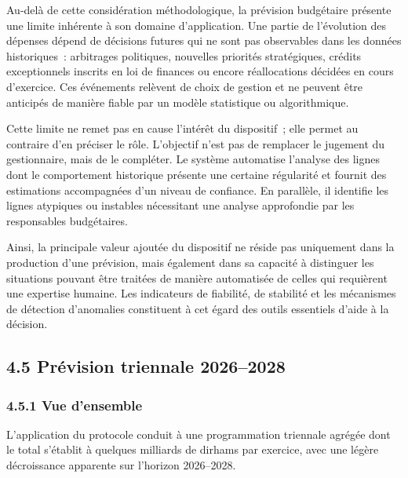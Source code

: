 Au-del\`a de cette consid\'eration m\'ethodologique, la pr\'evision
budg\'etaire pr\'esente une limite inh\'erente \`a son domaine
d'application. Une partie de l'\'evolution des d\'epenses d\'epend de
d\'ecisions futures qui ne sont pas observables dans les donn\'ees
historiques~: arbitrages politiques, nouvelles priorit\'es strat\'egiques,
cr\'edits exceptionnels inscrits en loi de finances ou encore
r\'eallocations d\'ecid\'ees en cours d'exercice. Ces \'ev\'enements
rel\`event de choix de gestion et ne peuvent \^etre anticip\'es de
mani\`ere fiable par un mod\`ele statistique ou algorithmique.

Cette limite ne remet pas en cause l'int\'er\^et du dispositif~; elle
permet au contraire d'en pr\'eciser le r\^ole. L'objectif n'est pas de
remplacer le jugement du gestionnaire, mais de le compl\'eter. Le
syst\`eme automatise l'analyse des lignes dont le comportement historique
pr\'esente une certaine r\'egularit\'e et fournit des estimations
accompagn\'ees d'un niveau de confiance. En parall\`ele, il identifie
les lignes atypiques ou instables n\'ecessitant une analyse approfondie
par les responsables budg\'etaires.

Ainsi, la principale valeur ajout\'ee du dispositif ne r\'eside pas
uniquement dans la production d'une pr\'evision, mais \'egalement dans
sa capacit\'e \`a distinguer les situations pouvant \^etre trait\'ees
de mani\`ere automatis\'ee de celles qui requi\`erent une expertise
humaine. Les indicateurs de fiabilit\'e, de stabilit\'e et les m\'ecanismes
de d\'etection d'anomalies constituent \`a cet \'egard des outils
essentiels d'aide \`a la d\'ecision.

\subsection*{4.5 \quad Pr\'evision triennale 2026--2028}

\subsubsection*{4.5.1 \quad Vue d'ensemble}

L'application du protocole conduit \`a une programmation triennale agr\'eg\'ee dont le total s'\'etablit \`a quelques milliards de dirhams par exercice, avec une l\'eg\`ere d\'ecroissance apparente sur l'horizon 2026--2028.

